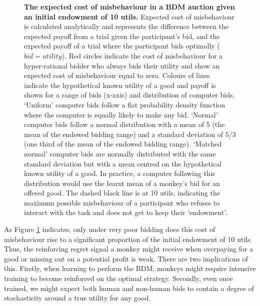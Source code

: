 \begin{figure}[p] 
\centering    

\caption[The expected cost of misbehaviour in a BDM auction given an initial endowment of 10 utils.]{\textbf{The expected cost of misbehaviour in a BDM auction given an initial endowment of 10 utils.} Expected cost of misbehaviour is calculated analytically and represents the difference between the expected payoff from a trial given the participant's bid, and the expected payoff of a trial where the participant bids optimally (${bid} = {utility}$). Red circles indicate the cost of misbehaviour for a hyper-rational bidder who always bids their utility and show an expected cost of misbehaviour equal to zero. Colours of lines indicate the hypothetical known utility of a good and payoff is shown for a range of bids (x-axis) and distribution of computer bids. ‘Uniform’ computer bids follow a flat probability density function where the computer is equally likely to make any bid. ‘Normal’ computer bids follow a normal distribution with a mean of 5 (the mean of the endowed bidding range) and a standard deviation of 5/3 (one third of the mean of the endowed bidding range). ‘Matched normal’ computer bids are normally distributed with the same standard deviation but with a mean centred on the hypothetical known utility of a good. In practice, a computer following this distribution would use the learnt mean of a monkey's bid for an offered good. The dashed black line is at 10 utils, indicating the maximum possible misbehaviour of a participant who refuses to interact with the task and does not get to keep their ‘endowment’.}
\label{fig:bdm_misbehaviour}
\end{figure}

As Figure \ref{fig:bdm_misbehaviour} indicates, only under very poor bidding does this cost of misbehaviour rise to a significant proportion of the initial endowment of 10 utils. Thus, the reinforcing regret signal a monkey might receive when overpaying for a good or missing out on a potential profit is weak. There are two implications of this. Firstly, when learning to perform the BDM, monkeys might require intensive training to become reinforced on the optimal strategy. Secondly, even once trained, we might expect both human and non-human bids to contain a degree of stochasticity around a true utility for any good.

